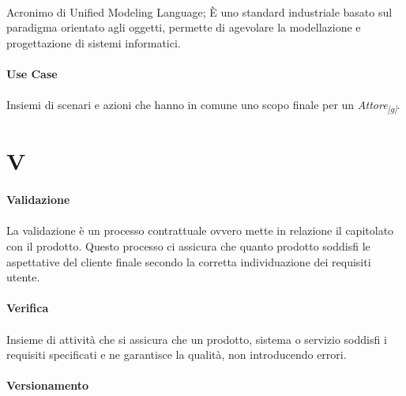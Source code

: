 \documentclass[10pt, a4paper]{article}
\newcommand{\pg}{\textsubscript{|g|}}
\begin{document}
\paragraph{}Acronimo di Unified Modeling Language; È uno standard industriale basato sul paradigma orientato agli oggetti, permette di agevolare la modellazione e progettazione di sistemi informatici.


\vspace{2em}
\paragraph{Use Case}\noindent\hrulefill
\paragraph{}Insiemi di scenari e azioni che hanno in comune uno scopo finale per un \textit{Attore\pg}.

\newpage
\section{V}
\vspace{2em}
\paragraph{Validazione}\noindent\hrulefill
\paragraph{}La validazione è un processo contrattuale ovvero mette in relazione il capitolato con il prodotto. Questo processo ci assicura che quanto prodotto soddisfi le aspettative del cliente finale secondo la corretta individuazione dei requisiti utente.

\vspace{2em}
\paragraph{Verifica}\noindent\hrulefill
\paragraph{}Insieme di attività che si assicura che un prodotto, sistema o servizio soddisfi i requisiti specificati e ne garantisce la qualità, non introducendo errori.


\vspace{2em}
\paragraph{Versionamento}\noindent\hrulefill
\end{document}
